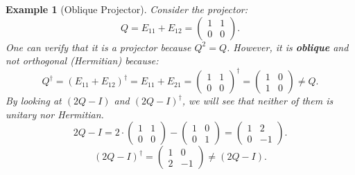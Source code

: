\documentclass[12pt]{article}
\theoremstyle{plain}
\newtheorem{example}{Example}[section]
\begin{document}
\begin{example}[Oblique Projector]
    Consider the projector:
    \begin{equation}
        Q = E_{11} + E_{12} = \begin{pmatrix}
            1 & 1\\
            0 & 0
        \end{pmatrix}.
    \end{equation}
    One can verify that it is a projector because $Q^2 = Q$. However, it is \textbf{oblique} and not orthogonal (Hermitian) because:
    \begin{equation}
        Q^\dagger = \left(E_{11} + E_{12}\right)^\dagger = E_{11} + E_{21} = \begin{pmatrix}
            1 & 1\\
            0 & 0
        \end{pmatrix}^\dagger = \begin{pmatrix}
            1 & 0\\
            1 & 0
        \end{pmatrix} \neq Q.
    \end{equation}
    By looking at $(2Q - I)$ and $(2Q - I)^\dagger$, we will see that neither of them is unitary nor Hermitian.
    \begin{equation}
        2Q - I = 2 \cdot\begin{pmatrix}
            1 & 1\\
            0 & 0
        \end{pmatrix} - \begin{pmatrix}
            1 & 0\\
            0 & 1
        \end{pmatrix} = \begin{pmatrix}
            1 & 2\\
            0 & -1
        \end{pmatrix}.
    \end{equation}
    \begin{equation}
        (2Q-I)^\dagger = \begin{pmatrix}
            1 & 0\\
            2 & -1
        \end{pmatrix} \neq \left(2Q - I\right).
    \end{equation}
\end{example}
\end{document}
